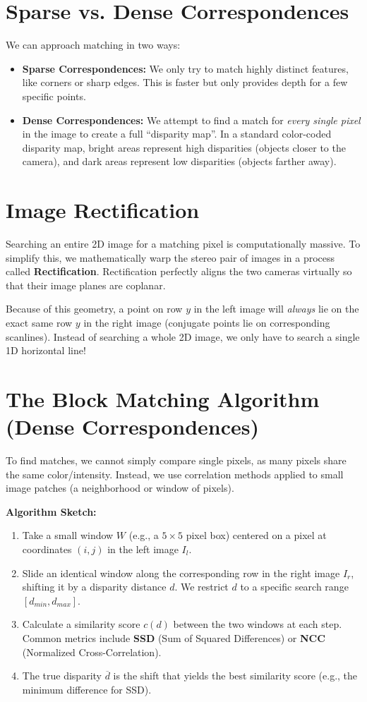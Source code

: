 \documentclass{report}
\begin{document}
\section{Sparse vs. Dense Correspondences}
We can approach matching in two ways:
\begin{itemize}
    \item \textbf{Sparse Correspondences:} We only try to match highly distinct features, like corners or sharp edges. This is faster but only
     provides depth for a few specific points.
    \item \textbf{Dense Correspondences:} We attempt to find a match for \textit{every single pixel} in the image to create a full ``disparity map''.
    In a standard color-coded disparity map, bright areas represent high disparities (objects closer to the camera), and dark areas represent low
    disparities (objects farther away).
\end{itemize}

\section{Image Rectification}
Searching an entire 2D image for a matching pixel is computationally massive. To simplify this, we mathematically warp the stereo pair of images in
a process called \textbf{Rectification}. Rectification perfectly aligns the two cameras virtually so that their image planes are coplanar.

Because of this geometry, a point on row $y$ in the left image will \textit{always} lie on the exact same row $y$ in the right image (conjugate
points lie on corresponding scanlines). Instead of searching a whole 2D image, we only have to search a single 1D horizontal line!

\section{The Block Matching Algorithm (Dense Correspondences)}
To find matches, we cannot simply compare single pixels, as many pixels share the same color/intensity. Instead, we use correlation methods
applied to small image patches (a neighborhood or window of pixels).

\textbf{Algorithm Sketch:}
\begin{enumerate}
    \item Take a small window $W$ (e.g., a $5 \times 5$ pixel box) centered on a pixel at coordinates $(i,j)$ in the left image $I_l$.
    \item Slide an identical window along the corresponding row in the right image $I_r$, shifting it by a disparity distance $d$. We restrict $d$
     to a specific search range $[d_{min}, d_{max}]$.
    \item Calculate a similarity score $c(d)$ between the two windows at each step. Common metrics include \textbf{SSD} (Sum of Squared Differences)
     or \textbf{NCC} (Normalized Cross-Correlation).
    \item The true disparity $\overline{d}$ is the shift that yields the best similarity score (e.g., the minimum difference for SSD).
\end{enumerate}
\end{document}
